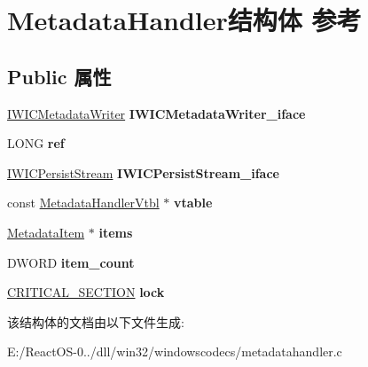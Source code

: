 \hypertarget{struct_metadata_handler}{}\section{Metadata\+Handler结构体 参考}
\label{struct_metadata_handler}
\subsection*{Public 属性}
\begin{DoxyCompactItemize}
\item 
\mbox{\label{struct_metadata_handler_a682e3931ca5cb136a50fdee114477644}} 
\hyperlink{interface_i_w_i_c_metadata_writer}{I\+W\+I\+C\+Metadata\+Writer} {\bfseries I\+W\+I\+C\+Metadata\+Writer\+\_\+iface}
\item 
\mbox{\label{struct_metadata_handler_aa03a603d365d6eca18b958ea247afb3f}} 
L\+O\+NG {\bfseries ref}
\item 
\mbox{\label{struct_metadata_handler_a3c3e2819bffa4ae612333c230c512348}} 
\hyperlink{interface_i_w_i_c_persist_stream}{I\+W\+I\+C\+Persist\+Stream} {\bfseries I\+W\+I\+C\+Persist\+Stream\+\_\+iface}
\item 
\mbox{\label{struct_metadata_handler_afdd3caa433513dbc5534e1c2fc71dc0b}} 
const \hyperlink{struct___metadata_handler_vtbl}{Metadata\+Handler\+Vtbl} $\ast$ {\bfseries vtable}
\item 
\mbox{\label{struct_metadata_handler_a151c89b78b40eadd3beb06554aa05044}} 
\hyperlink{struct___metadata_item}{Metadata\+Item} $\ast$ {\bfseries items}
\item 
\mbox{\label{struct_metadata_handler_a745ab151c09d3541481212f789c6462a}} 
D\+W\+O\+RD {\bfseries item\+\_\+count}
\item 
\mbox{\label{struct_metadata_handler_a3fa336629b8a34709e65d8923ab91e77}} 
\hyperlink{struct___c_r_i_t_i_c_a_l___s_e_c_t_i_o_n}{C\+R\+I\+T\+I\+C\+A\+L\+\_\+\+S\+E\+C\+T\+I\+ON} {\bfseries lock}
\end{DoxyCompactItemize}


该结构体的文档由以下文件生成\+:\begin{DoxyCompactItemize}
\item 
E\+:/\+React\+O\+S-\/0../dll/win32/windowscodecs/metadatahandler.\+c\end{DoxyCompactItemize}
